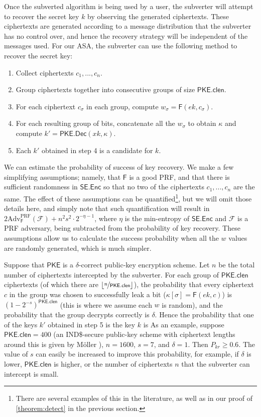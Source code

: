 Once the subverted algorithm is being used by a user, the subverter will attempt to recover the secret key $k$ by observing the generated ciphertexts. These ciphertexts are generated according to a message distribution that the subverter has no control over, and hence the recovery strategy will be independent of the messages used. For our ASA, the subverter can use the following method to recover the secret key:
\begin{enumerate}\itemsep0em
\item Collect ciphertexts $c_1,...,c_n$.
\item Group ciphertexts together into consecutive groups of size $\mathsf{PKE.clen}$.
\item For each ciphertext $c_\sigma$ in each group, compute $w_\sigma = \mathsf{F}(ek, c_\sigma)$.
\item For each resulting group of bits, concatenate all the $w_\sigma$ to obtain $\kappa$ and compute $k'=\mathsf{PKE.Dec}(xk,\kappa)$.
\item Each $k'$ obtained in step 4 is a candidate for $k$.
\end{enumerate}

We can estimate the probability of success of key recovery. We make a few simplifying assumptions; namely, that $\mathsf{F}$ is a good PRF, and that there is sufficient randomness in $\mathsf{SE.Enc}$ so that no two of the ciphertexts $c_1,...,c_n$ are the same. The effect of these assumptions can be quantified\footnote{There are several examples of this in the literature, as well as in our proof of \autoref{theorem:detect} in the previous section.}, but we will omit those details here, and simply note that such quantification will result in $2\text{Adv}^{\mathrm{PRF}}_\mathsf{F}(\mathcal{F})+n^2s^2\cdot 2^{-\eta-1}$, where $\eta$ is the min-entropy of $\mathsf{SE.Enc}$ and $\mathcal{F}$ is a PRF adversary, being subtracted from the probability of key recovery. These assumptions allow us to calculate the success probability when all the $w$ values are randomly generated, which is much simpler.

Suppose that $\mathsf{PKE}$ is a $\delta$-correct public-key encryption scheme. Let $n$ be the total number of ciphertexts intercepted by the subverter. For each group of $\mathsf{PKE.clen}$ ciphertexts (of which there are $\lfloor \nicefrac{n}{\mathsf{PKE.clen}} \rfloor$), the probability that every ciphertext $c$ in the group was chosen to successfully leak a bit ($\kappa[\sigma]=\mathsf{F}(ek,c)$) is $(1-2^{-s})^\mathsf{PKE.clen}$ (this is where we assume each $w$ is random), and the probability that the group decrypts correctly is $\delta$. Hence the probability that one of the keys $k'$ obtained in step 5 is the key $k$ is
As an example, suppose $\mathsf{PKE.clen}=400$ (an IND\$-secure public-key scheme with ciphertext lengths around this is given by Möller \cite{ESORICS:Moller04}), $n=1600$, $s=7$, and $\delta=1$. Then $P_{kr}\ge 0.6$. The value of $s$ can easily be increased to improve this probability, for example, if $\delta$ is lower, $\mathsf{PKE.clen}$ is higher, or the number of ciphertexts $n$ that the subverter can intercept is small.

